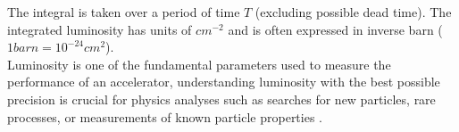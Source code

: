 The integral is taken over a period of time $T$ (excluding possible dead time). The integrated luminosity has units of $cm^{-2}$ and is often expressed in inverse barn ($1 barn= 10^{-24}cm^{2}$). \\


Luminosity is one of the fundamental parameters used to measure the performance of an accelerator, understanding luminosity with the best possible precision is crucial for physics analyses such as searches for new particles, rare processes, or measurements of known particle properties \cite{lumi_motiv}.





